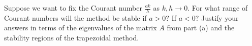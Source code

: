 Suppose we want to fix the Courant number $\frac{ak}{h}$ as $k,h \to 0$. For what range of Courant numbers will the
method be stable if $a > 0$? If $a < 0$? Justify your answers in terms of the eigenvalues of the matrix $A$ from part 
(a) and the stability regions of the trapezoidal method.

\begin{solution}\ \\\\
    \hfill\vfill
    \ \\
\end{solution}